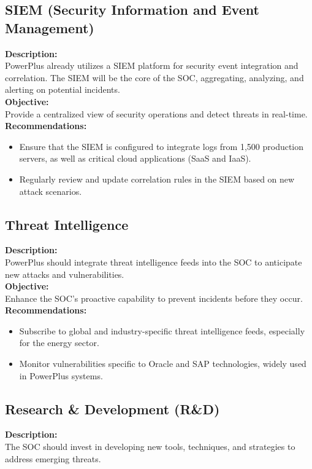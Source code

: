 \subsection*{ SIEM (Security Information and Event Management)}
\textbf{Description:} \\
PowerPlus already utilizes a SIEM platform for security event integration and correlation. The SIEM will be the core of the SOC, aggregating, analyzing, and alerting on potential incidents. \\

\textbf{Objective:} \\
Provide a centralized view of security operations and detect threats in real-time. \\

\textbf{Recommendations:}
\begin{itemize}
    \item Ensure that the SIEM is configured to integrate logs from 1,500 production servers, as well as critical cloud applications (SaaS and IaaS).
    \item Regularly review and update correlation rules in the SIEM based on new attack scenarios.
\end{itemize}

\subsection*{ Threat Intelligence}
\textbf{Description:} \\
PowerPlus should integrate threat intelligence feeds into the SOC to anticipate new attacks and vulnerabilities. \\

\textbf{Objective:} \\
Enhance the SOC's proactive capability to prevent incidents before they occur. \\

\textbf{Recommendations:}
\begin{itemize}
    \item Subscribe to global and industry-specific threat intelligence feeds, especially for the energy sector.
    \item Monitor vulnerabilities specific to Oracle and SAP technologies, widely used in PowerPlus systems.
\end{itemize}

\subsection*{ Research \& Development (R\&D)}
\textbf{Description:} \\
The SOC should invest in developing new tools, techniques, and strategies to address emerging threats. \\

